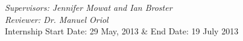 \documentclass[11pt,a4paper]{report}
\begin{document}
\begin{titlepage}
\bigskip
     
     {\fontsize{12}{22}\selectfont \it {Supervisors: Jennifer Mowat and Ian Broster} }\\[1\baselineskip]    
     {\fontsize{12}{22}\selectfont \it {Reviewer: Dr. Manuel Oriol} }\\[1\baselineskip]    
    
    \bigskip\bigskip\bigskip
     {\fontsize{13}{23}\selectfont Internship Start Date:  29 May, 2013 \& End Date: 19 July 2013 }\\[0.5\baselineskip]
 
  \end{titlepage}
  
 
  
 
 
 \newpage
 
\end{document}
